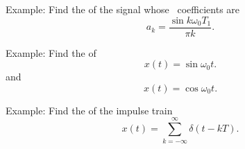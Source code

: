 \begin{frame}[plain]
    Example: Find the \ft of the signal whose \fs~coefficients are 
    \begin{equation*}
        a_k = \frac{\sin k \omega_0 T_1}{\pi k}.
    \end{equation*}
\end{frame}

\begin{frame}[plain]
    Example:  Find the \ft of 
    \begin{equation*}
        x(t) = \sin \omega_0 t.
    \end{equation*}
    and
    \begin{equation*}
        x(t) = \cos \omega_0 t.
    \end{equation*}    
\end{frame}

\begin{frame}[plain]
    Example: Find the \ft of the impulse train
    \begin{equation*}
        x(t) = \sum_{k=-\infty}^{\infty} \delta(t-kT).
    \end{equation*}
\end{frame}